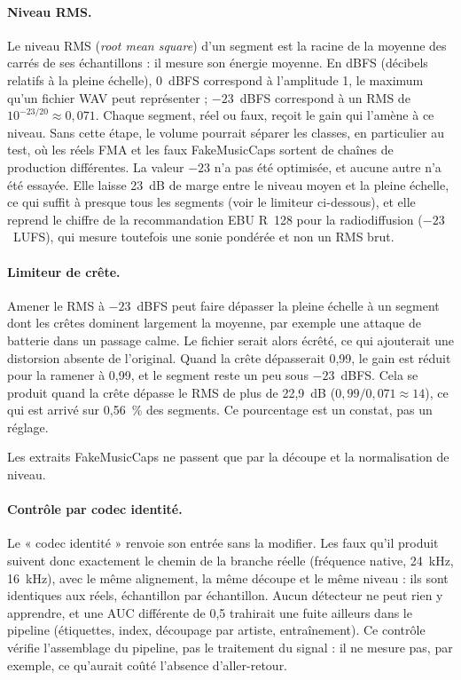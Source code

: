 \documentclass[a4paper, 11pt]{article}
\begin{document}
\paragraph{Niveau RMS.} Le niveau RMS (\emph{root mean square}) d'un segment est la racine de la moyenne des
carrés de ses échantillons : il mesure son énergie moyenne. En dBFS (décibels relatifs à la pleine échelle),
0~dBFS correspond à l'amplitude 1, le maximum qu'un fichier WAV peut représenter ; $-23$~dBFS correspond à un
RMS de $10^{-23/20} \approx 0{,}071$. Chaque segment, réel ou faux, reçoit le gain qui l'amène à ce niveau. Sans
cette étape, le volume pourrait séparer les classes, en particulier au test, où les réels FMA et les faux
FakeMusicCaps sortent de chaînes de production différentes. La valeur $-23$ n'a pas été optimisée, et aucune
autre n'a été essayée. Elle laisse 23~dB de marge entre le niveau moyen et la pleine échelle, ce qui suffit à
presque tous les segments (voir le limiteur ci-dessous), et elle reprend le chiffre de la recommandation EBU
R~128 pour la radiodiffusion ($-23$~LUFS), qui mesure toutefois une sonie pondérée et non un RMS brut.

\paragraph{Limiteur de crête.} Amener le RMS à $-23$~dBFS peut faire dépasser la pleine échelle à un segment
dont les crêtes dominent largement la moyenne, par exemple une attaque de batterie dans un passage calme. Le
fichier serait alors écrêté, ce qui ajouterait une distorsion absente de l'original. Quand la crête dépasserait
0,99, le gain est réduit pour la ramener à 0,99, et le segment reste un peu sous $-23$~dBFS. Cela se produit
quand la crête dépasse le RMS de plus de 22,9~dB ($0{,}99 / 0{,}071 \approx 14$), ce qui est arrivé sur 0,56~\%
des segments. Ce pourcentage est un constat, pas un réglage.

Les extraits FakeMusicCaps ne passent que par la découpe et la normalisation de niveau.

\paragraph{Contrôle par codec identité.} Le « codec identité » renvoie son entrée sans la modifier. Les faux
qu'il produit suivent donc exactement le chemin de la branche réelle (fréquence native, 24~kHz, 16~kHz), avec
le même alignement, la même découpe et le même niveau : ils sont identiques aux réels, échantillon par
échantillon. Aucun détecteur ne peut rien y apprendre, et une AUC différente de 0,5 trahirait une fuite
ailleurs dans le pipeline (étiquettes, index, découpage par artiste, entraînement). Ce contrôle vérifie
l'assemblage du pipeline, pas le traitement du signal : il ne mesure pas, par exemple, ce qu'aurait coûté
l'absence d'aller-retour.
\end{document}
